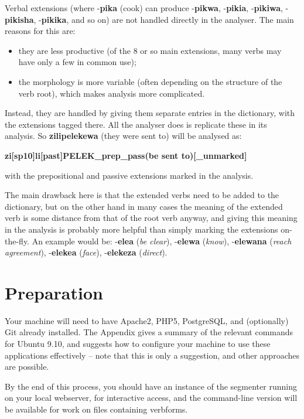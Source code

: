 \documentclass[a4paper,10pt]{article}
\begin{document}
Verbal extensions (where -\textbf{pika} (cook) can produce -\textbf{pikwa}, -\textbf{pikia}, -\textbf{pikiwa}, -\textbf{pikisha}, -\textbf{pikika}, and so on) are not handled directly in the analyser. The main reasons for this are:
\begin{itemize}
\item they are less productive (of the 8 or so main extensions, many verbs may have only a few in common use);
\item the morphology is more variable (often depending on the structure of the verb root), which makes analysis more complicated.
\end{itemize}
Instead, they are handled by giving them separate entries in the dictionary, with the extensions tagged there.  All the analyser does is replicate these in its analysis.  So \textbf{zilipelekewa} (they were sent to) will be analysed as:
\begin{center}
\textbf{zi[sp10]li[past]PELEK\_prep\_pass(be sent to)[\_unmarked]}
\end{center}
with the prepositional and passive extensions marked in the analysis.

The main drawback here is that the extended verbs need to be added to the dictionary, but on the other hand in many cases the meaning of the extended verb is some distance from that of the root verb anyway, and giving this meaning in the analysis is probably more helpful than simply marking the extensions on-the-fly.  An example would be: -\textbf{elea} (\textit{be clear}), -\textbf{elewa} (\textit{know}), -\textbf{elewana} (\textit{reach agreement}), -\textbf{elekea} (\textit{face}), -\textbf{elekeza} (\textit{direct}).

\section{Preparation}

Your machine will need to have Apache2, PHP5, PostgreSQL, and (optionally) Git already installed.  The Appendix gives a summary of the relevant commands for Ubuntu 9.10, and suggests how to configure your machine to use these applications effectively -- note that this is only a suggestion, and other approaches are possible.

By the end of this process, you should have an instance of the segmenter running on your local webserver, for interactive access, and the command-line version will be available for work on files containing verbforms.
\end{document}
